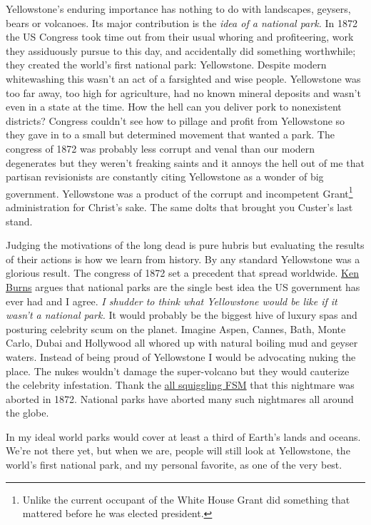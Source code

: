 Yellowstone's enduring importance has nothing to do with landscapes,
geysers, bears or volcanoes. Its major contribution is the \emph{idea of
a national park.} In 1872 the US Congress took time out from their usual
whoring and profiteering, work they assiduously pursue to this day, and
accidentally did something worthwhile; they created the world's first
national park: Yellowstone. Despite modern whitewashing this wasn't an
act of a farsighted and wise people. Yellowstone was too far away, too
high for agriculture, had no known mineral deposits and wasn't even in a
state at the time. How the hell can you deliver pork to nonexistent
districts? Congress couldn't see how to pillage and profit from
Yellowstone so they gave in to a small but determined movement that
wanted a park. The congress of 1872 was probably less corrupt and venal
than our modern degenerates but they weren't freaking saints and it
annoys the hell out of me that partisan revisionists are constantly
citing Yellowstone as a wonder of big government. Yellowstone was a
product of the corrupt and incompetent
Grant\footnote{
Unlike the current occupant of the White House Grant did something
that mattered before he was elected president.
} administration for Christ's sake.
The same dolts that brought you Custer's last stand.

Judging the motivations of the long dead is pure hubris but evaluating
the results of their actions is how we learn from history. By any
standard Yellowstone was a glorious result. The congress of 1872 set a
precedent that spread worldwide.
\href{http://www.pbs.org/nationalparks/}{Ken Burns} argues that national
parks are the single best idea the US government has ever had and I
agree. \emph{I shudder to think what Yellowstone would be like if it
wasn't a national park.} It would probably be the biggest hive of luxury
spas and posturing celebrity scum on the planet. Imagine Aspen, Cannes,
Bath, Monte Carlo, Dubai and Hollywood all whored up with natural
boiling mud and geyser waters. Instead of being proud of Yellowstone I
would be advocating nuking the place. The nukes wouldn't damage the
super-volcano but they would cauterize the celebrity infestation. Thank
the \href{http://www.venganza.org/}{all squiggling FSM} that this
nightmare was aborted in 1872. National parks have aborted many such
nightmares all around the globe.

In my ideal world parks would cover at least a third of Earth's lands
and oceans. We're not there yet, but when we are, people will still look
at Yellowstone, the world's first national park, and my personal
favorite, as one of the very best.

